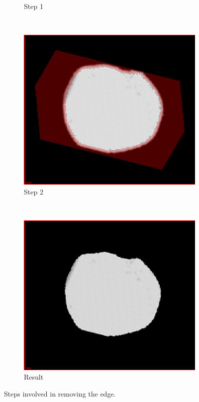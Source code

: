 \begin{figure}[h]
\begin{subfigure}[b]{0.45\textwidth}
    \caption{Step 1}
    \label{fig:erosion1}
  \end{subfigure}  
  ~ %
  \begin{subfigure}[b]{0.45\textwidth}
    \includegraphics[width=\textwidth]{images/erosion/erosion_2.png}
    \caption{Step 2}
    \label{fig:erosion2}
  \end{subfigure}%
  ~ %
  \begin{subfigure}[b]{0.45\textwidth}
    \includegraphics[width=\textwidth]{images/erosion/erosion_3.png}
    \caption{Result}
    \label{fig:erosion3}
  \end{subfigure}  
  \caption{Steps involved in removing the edge.}\label{fig:erosionoverview}
\end{figure}

